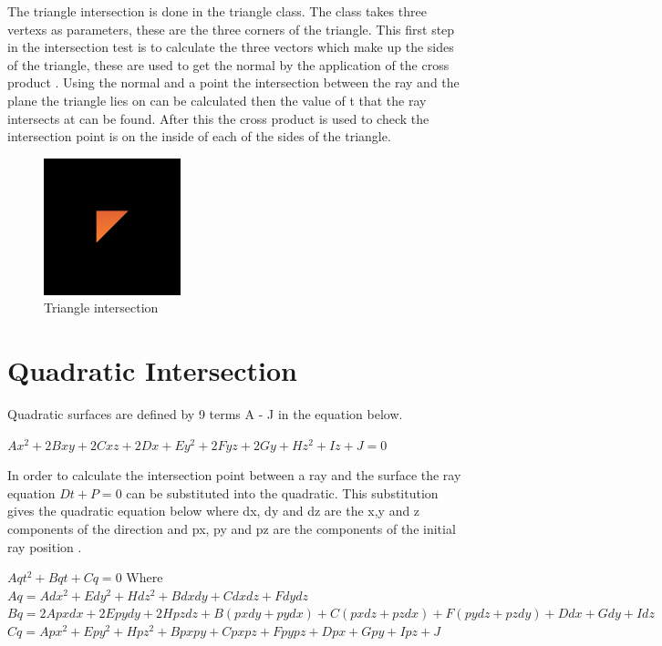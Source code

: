 \documentclass{article}
\begin{document}
The triangle intersection is done in the triangle class. The class takes three
vertexs as parameters, these are the three corners of the triangle. This first step in the
intersection test is to calculate the three vectors which make up the sides
of the triangle, these are used to get the normal by the application of the
cross product \cite{triabgle}. Using the normal and a point the intersection between the
ray and the plane the triangle lies on can be calculated then the value of t that
the ray intersects at can be found. After this the cross product is used to check
the intersection point is on the inside of each of the sides of the triangle.

\begin{figure}[H]
  \begin{center}
  \includegraphics[width=150px]{Images/triangle.png}
  \caption{Triangle intersection}
  \label{fig:triint}
  \end{center}
\end{figure}

\section{Quadratic Intersection}

Quadratic surfaces are defined by 9 terms A - J in the equation below.

\begin{center}
$Ax^2 + 2Bxy + 2Cxz + 2Dx + Ey^2 + 2Fyz + 2Gy + Hz^2 + Iz + J = 0$
\end{center}

In order to calculate the intersection point between a ray and the surface the
ray equation $Dt + P = 0$ can be substituted into the quadratic. This substitution gives the
quadratic equation below where dx, dy and dz are the x,y and z components of the
direction and px, py and pz are the components of the initial ray position \cite{quadratic}.

\begin{center}
$Aqt^2 + Bqt + Cq = 0$ Where
$Aq = Adx^2 + Edy^2 + Hdz^2 + Bdxdy + Cdxdz + Fdydz$
$Bq = 2Apxdx + 2Epydy + 2Hpzdz + B(pxdy + pydx) + C(pxdz + pzdx) + F(pydz + pzdy) + Ddx + Gdy + Idz$
$Cq = Apx^2 + Epy^2 + Hpz^2 + Bpxpy + Cpxpz + Fpypz + Dpx + Gpy + Ipz + J$
\end{center}
\end{document}

